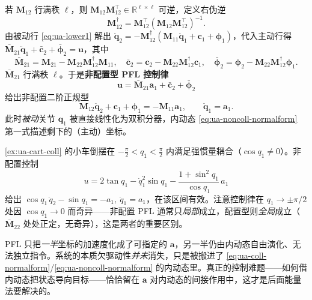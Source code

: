 若 $\mathbf{M}_{12}$ 行满秩 $\ell$，则 $\mathbf{M}_{12}\mathbf{M}_{12}^\top\in\mathbb{R}^{\ell\times\ell}$ 可逆，定义右伪逆
\begin{equation}\label{eq:ua-pinv}
  \mathbf{M}_{12}^{\dagger}=\mathbf{M}_{12}^\top(\mathbf{M}_{12}\mathbf{M}_{12}^\top)^{-1}.
\end{equation}
由被动行 \cref{eq:ua-lower1} 解出 $\ddot{\mathbf{q}}_2=-\mathbf{M}_{12}^{\dagger}(\mathbf{M}_{11}\ddot{\mathbf{q}}_1+\mathbf{c}_1+\boldsymbol{\phi}_1)$，代入主动行得 $\bar{\mathbf{M}}_{21}\ddot{\mathbf{q}}_1+\bar{\mathbf{c}}_2+\bar{\boldsymbol{\phi}}_2=\mathbf{u}$，其中
\begin{equation}\label{eq:ua-noncoll-terms}
  \bar{\mathbf{M}}_{21}=\mathbf{M}_{21}-\mathbf{M}_{22}\mathbf{M}_{12}^{\dagger}\mathbf{M}_{11},\quad
  \bar{\mathbf{c}}_2=\mathbf{c}_2-\mathbf{M}_{22}\mathbf{M}_{12}^{\dagger}\mathbf{c}_1,\quad
  \bar{\boldsymbol{\phi}}_2=\boldsymbol{\phi}_2-\mathbf{M}_{22}\mathbf{M}_{12}^{\dagger}\boldsymbol{\phi}_1.
\end{equation}
$\bar{\mathbf{M}}_{21}$ 行满秩 $\ell$。于是\textbf{非配置型 PFL 控制律}
\begin{equation}\label{eq:ua-noncoll-law}
  \mathbf{u}=\bar{\mathbf{M}}_{21}\mathbf{a}_1+\bar{\mathbf{c}}_2+\bar{\boldsymbol{\phi}}_2
\end{equation}
给出非配置二阶正规型
\begin{equation}\label{eq:ua-noncoll-normalform}
  \boxed{\ \mathbf{M}_{12}\ddot{\mathbf{q}}_2+\mathbf{c}_1+\boldsymbol{\phi}_1=-\mathbf{M}_{11}\mathbf{a}_1,\qquad \ddot{\mathbf{q}}_1=\mathbf{a}_1.\ }
\end{equation}
此时\emph{被动}关节 $\mathbf{q}_1$ 被直接线性化为双积分器，内动态 \cref{eq:ua-noncoll-normalform} 第一式描述剩下的（主动）坐标。

\begin{example}\label{ex:ua-cart-noncoll}
\cref{ex:ua-cart-coll} 的小车倒摆在 $-\tfrac{\pi}{2}<q_1<\tfrac{\pi}{2}$ 内满足强惯量耦合（$\cos q_1\ne0$）。非配置控制
\[
  u=2\tan q_1-\dot{q}_1^2\sin q_1-\frac{1+\sin^2 q_1}{\cos q_1}\,a_1
\]
给出 $\cos q_1\,\ddot{q}_2-\sin q_1=-a_1,\ \ddot{q}_1=a_1$，在该区间有效。注意控制律在 $q_1\to\pm\pi/2$ 处因 $\cos q_1\to0$ 而奇异——非配置 PFL 通常只\emph{局部}成立，配置型则\emph{全局}成立（$\bar{\mathbf{M}}_{22}$ 处处正定，无奇异），这是两者的重要区别。
\end{example}

\begin{pitfall}
PFL 只把\emph{一半}坐标的加速度化成了可指定的 $\mathbf{a}$，另一半仍由内动态自由演化、无法独立指令。系统的本质欠驱动性\emph{并未}消失，只是被搬进了 \cref{eq:ua-coll-normalform}/\cref{eq:ua-noncoll-normalform} 的内动态里。真正的控制难题——如何借内动态把状态导向目标——恰恰留在 $\mathbf{a}$ 对内动态的间接作用中，这才是后面能量法要解决的。
\end{pitfall}

